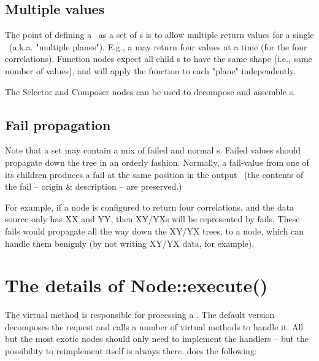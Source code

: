 \documentclass[10pt]{article}
\begin{document}
\subsection{Multiple values}

  The point of defining a \Result\ as a set of \VellSet{}s is to allow multiple
  return values for a single \Cells\ (a.k.a. "multiple planes"). E.g., a
   may return four values at a time (for the four correlations).
  Function nodes expect all child \Result{}s to have the same shape (i.e., same
  number of values), and will apply the function to each "plane" independently.

  The Selector and Composer nodes can be used to decompose and assemble
  \Result{}s.
  
\subsection{Fail propagation}

  Note that a set may contain a mix of failed and normal \VellSet{}s. Failed
  values should propagate down the tree in an orderly fashion. Normally, a
  fail-value from one of its children produces a fail at the same position in
  the output \Result\ (the contents of the fail -- origin \& description -- are
  preserved.)

  For example, if a  node is configured to return four correlations,
  and the data source only has XX and YY, then XY/YXs will be represented by
  fails. These fails would propagate all the way down the XY/YX trees, to a
   node, which can handle them benignly (by not writing XY/YX data,
  for example).

\section{The details of Node::execute()}

  The virtual  method is responsible for processing a
  \Request. The default version decomposes the request and calls a number of
  virtual methods to handle it. All but the most exotic nodes should only need
  to implement the handlers -- but the possibility to reimplement 
  itself is always there.  does the following:
\end{document}
